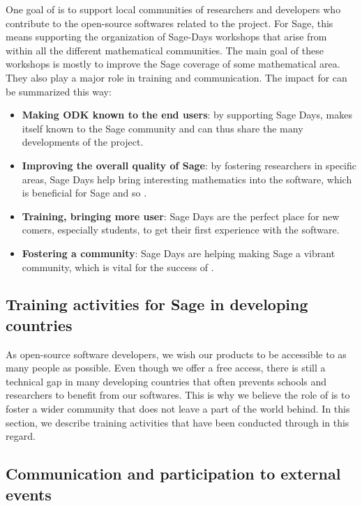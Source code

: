 \documentclass{deliverablereport}
\begin{document}
One goal of \ODK is to support local communities of researchers
and developers who contribute to the open-source softwares related to
the project. For Sage, this means supporting the organization of Sage-Days
workshops that arise from within all the different mathematical communities. The main 
goal of these workshops is mostly to improve the Sage coverage of some mathematical
area. They also play a major role in training and communication. The
impact for \ODK can be summarized this way:

\begin{itemize}
\item \textbf{Making ODK known to the end users}: by supporting Sage Days,
\ODK makes itself known to the Sage community and can
thus share the many developments of the project.

\item \textbf{Improving the overall quality of Sage}: by fostering researchers
in specific areas, Sage Days help bring interesting mathematics into
the software, which is beneficial for Sage and so \ODK.

\item \textbf{Training, bringing more user}: Sage Days are the perfect place
for new comers, especially students, to get their first experience with the software.

\item \textbf{Fostering a community}: Sage Days are helping making Sage a vibrant
community, which is vital for the success of \ODK.
\end{itemize}

\subsection{Training activities for Sage in developing countries}

As open-source software developers, we wish our products
to be accessible to as many people as possible. Even though we offer
 a free access, there is still a technical gap in many 
developing countries that 
often prevents schools and researchers to benefit from our softwares.
This is why we believe the role of \ODK is to foster 
a wider community that does not leave a part of the world behind. In 
this section, we describe training activities that have been conducted 
through \ODK in this regard.


\subsection{Communication and participation to external events}
\end{document}
